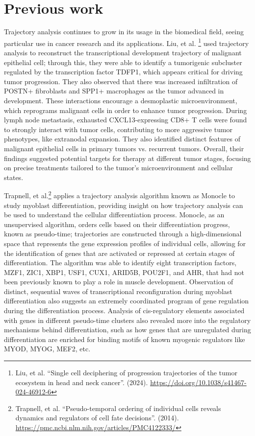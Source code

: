 \documentclass{article}
\begin{document}
\section{Previous work}
Trajectory analysis continues to grow in its usage in the biomedical field, seeing particular use in cancer research and its applications. Liu, et al. \footnote{Liu, et al. “Single cell deciphering of progression trajectories of the tumor ecosystem in head and neck cancer”. (2024). \url{https://doi.org/10.1038/s41467-024-46912-6}} used trajectory analysis to reconstruct the transcriptional development trajectory of malignant epithelial cell; through this, they were able to identify a tumorigenic subcluster regulated by the transcription factor TDFP1, which appears critical for driving tumor progression. They also observed that there was increased infiltration of POSTN+ fibroblasts and SPP1+ macrophages as the tumor advanced in development. These interactions encourage a desmoplastic microenvironment, which reprograms malignant cells in order to enhance tumor progression. During lymph node metastasis, exhausted CXCL13-expressing CD8+ T cells were found to strongly interact with tumor cells, contributing to more aggressive tumor phenotypes, like extranodal expansion. They also identified distinct features of malignant epithelial cells in primary tumors vs. recurrent tumors. Overall, their findings suggested potential targets for therapy at different tumor stages, focusing on precise treatments tailored to the tumor’s microenvironment and cellular states. 

Trapnell, et al.\footnote{Trapnell, et al. “Pseudo-temporal ordering of individual cells reveals dynamics and regulators of cell fate decisions”. (2014). \url{https://pmc.ncbi.nlm.nih.gov/articles/PMC4122333/}} applies a trajectory analysis algorithm known as Monocle to study myoblast differentiation, providing insight on how trajectory analysis can be used to understand the cellular differentiation process. Monocle, as an unsupervised algorithm, orders cells based on their differentiation progress, known as pseudo-time; trajectories are constructed through a high-dimensional space that represents the gene expression profiles of individual cells, allowing for the identification of genes that are activated or repressed at certain stages of differentiation. The algorithm was able to identify eight transcription factors, MZF1, ZIC1, XBP1, USF1, CUX1, ARID5B, POU2F1, and AHR, that had not been previously known to play a role in muscle development. Observation of distinct, sequential waves of transcriptional reconfiguration during myoblast differentiation also suggests an extremely coordinated program of gene regulation during the differentiation process. Analysis of cis-regulatory elements associated with genes in different pseudo-time clusters also revealed more into the regulatory mechanisms behind differentiation, such as how genes that are unregulated during differentiation are enriched for binding motifs of known myogenic regulators like MYOD, MYOG, MEF2, etc.
\end{document}
